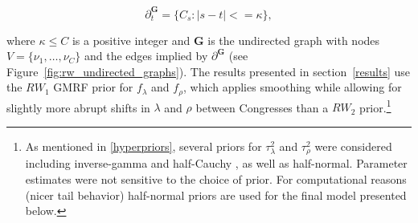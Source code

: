 \begin{equation*}
\partial^\mathbf{G}_t = \{C_s : \left| s - t \right| <= \kappa \},
\end{equation*}

\noindent where $\kappa \leq C$ is a positive integer and $\mathbf{G}$ is the undirected graph 
with nodes $V = \{\nu_1, \dots, \nu_C\}$ and the edges implied by $\partial^\mathbf{G}$ 
(see Figure~\ref{fig:rw_undirected_graphs}). The results presented in section~\ref{results} use 
the $RW_1$ GMRF prior for $f_\lambda$ and $f_\rho$, which applies smoothing while allowing 
for slightly more abrupt shifts in $\lambda$ and $\rho$ between Congresses than a 
$RW_2$ prior.\footnote{As mentioned in \ref{hyperpriors}, several priors for $\tau^2_\lambda$ 
and $\tau^2_\rho$ were considered including inverse-gamma  
and half-Cauchy , as well as half-normal. Parameter estimates were 
not sensitive to the choice of prior. For computational reasons (nicer tail behavior) half-normal priors 
are used for the final model presented below.}
 



